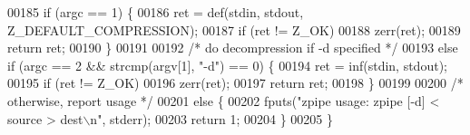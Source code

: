 \begin{DoxyCode}
00185     \textcolor{keywordflow}{if} (argc == 1) \{
00186         ret = def(stdin, stdout, Z\_DEFAULT\_COMPRESSION);
00187         \textcolor{keywordflow}{if} (ret != Z\_OK)
00188             zerr(ret);
00189         \textcolor{keywordflow}{return} ret;
00190     \}
00191 
00192     \textcolor{comment}{/* do decompression if -d specified */}
00193     \textcolor{keywordflow}{else} \textcolor{keywordflow}{if} (argc == 2 && strcmp(argv[1], \textcolor{stringliteral}{"-d"}) == 0) \{
00194         ret = inf(stdin, stdout);
00195         \textcolor{keywordflow}{if} (ret != Z\_OK)
00196             zerr(ret);
00197         \textcolor{keywordflow}{return} ret;
00198     \}
00199 
00200     \textcolor{comment}{/* otherwise, report usage */}
00201     \textcolor{keywordflow}{else} \{
00202         fputs(\textcolor{stringliteral}{"zpipe usage: zpipe [-d] < source > dest\(\backslash\)n"}, stderr);
00203         \textcolor{keywordflow}{return} 1;
00204     \}
00205 \}
\end{DoxyCode}

